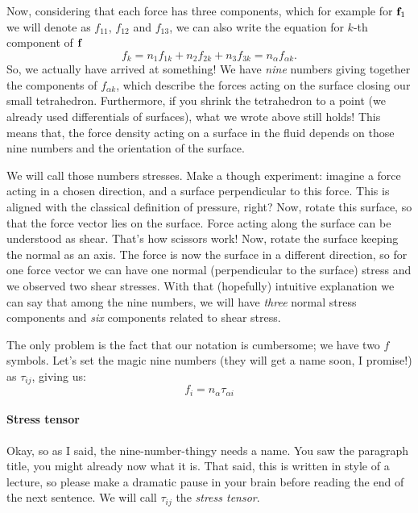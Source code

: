 \documentclass[a4paper]{article}
\begin{document}
Now, considering that each force has three components, which for example for
\(\vb{f}_1\) we will denote as \(f_{11}\), \(f_{12}\) and \(f_{13}\), we can
also write the equation for \(k\)-th component of \(\vb{f}\)
\[
	f_k = n_1 f_{1k} + n_2 f_{2k} +n_3 f_{3k} = n_\alpha f_{\alpha k}.
\]
So, we actually have arrived at something! We have \emph{nine} numbers giving
together the components of \(f_{\alpha k}\), which describe the forces acting
on the surface closing our small tetrahedron. Furthermore, if you shrink the
tetrahedron to a point (we already used differentials of surfaces), what we
wrote above still holds! This means that, the force density acting on a surface
in the fluid depends on those nine numbers and the orientation of the surface.

We will call those numbers stresses. Make a though experiment: imagine a force
acting in a chosen direction, and a surface perpendicular to this force. This
is aligned with the classical definition of pressure, right? Now, rotate this
surface, so that the force vector lies on the surface. Force acting along the
surface can be understood as shear. That's how scissors work! Now, rotate the
surface keeping the normal as an axis. The force is now  the
surface in a different direction, so for one force vector we can have one normal
(perpendicular to the surface)
stress and we observed two shear stresses. With that (hopefully) intuitive
explanation we can say that among the nine numbers, we will have \emph{three}
normal stress components and \emph{six} components related to shear stress.

The only problem is the fact that our notation is cumbersome; we have two \(f\)
symbols. Let's set the magic nine numbers (they will get a name soon, I promise!)
as \(\tau_{ij}\), giving us:
\[
	f_i = n_\alpha \tau_{\alpha i}
\]

\paragraph{Stress tensor}
Okay, so as I said, the nine-number-thingy needs a name. You saw the paragraph
title, you might already now what it is. That said, this is written in style of
a lecture, so please make a dramatic pause in your brain before reading the end of the
next sentence. We will call \(\tau_{ij}\) the \emph{stress tensor}.
\end{document}
